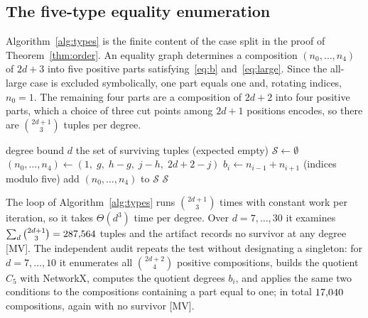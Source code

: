 \documentclass[11pt]{article}
\theoremstyle{remark}
\begin{document}
\begin{table}[ht]
\centering\footnotesize

\caption{SHA-256 fingerprints (first 16 hexadecimal digits) of the scripts and artifacts that carry the exact computations; origin ``audit'' and ``certificate'' are the EXP-003 values recorded by the independent audit and by the certificate, and ``computed here'' marks the EXP-004 values, computed from the archived artifact files when the tables are generated.}
\label{tab:records}
\end{table}

\subsection{The five-type equality enumeration}\label{sec:types}

Algorithm~\ref{alg:types} is the finite content of the case split in the proof of Theorem~\ref{thm:order}. An equality graph determines a composition $(n_0,\ldots,n_4)$ of $2d+3$ into five positive parts satisfying~\eqref{eq:b} and~\eqref{eq:large}. Since the all-large case is excluded symbolically, one part equals one and, rotating indices, $n_0=1$. The remaining four parts are a composition of $2d+2$ into four positive parts, which a choice of three cut points among $2d+1$ positions encodes, so there are $\binom{2d+1}{3}$ tuples per degree.

\begin{algorithm}[ht]
\caption{Five-type equality enumeration with a designated singleton.}\label{alg:types}
\begin{algorithmic}[1]
\Require degree bound $d$
\Ensure the set of surviving tuples (expected empty)
\State $\mathcal S\gets\emptyset$
  \State $(n_0,\ldots,n_4)\gets(1,\;g,\;h-g,\;j-h,\;2d+2-j)$
   $b_i\gets n_{i-1}+n_{i+1}$ (indices modulo five) \EndFor
     \State add $(n_0,\ldots,n_4)$ to $\mathcal S$
  \EndIf
\EndFor
\State \Return $\mathcal S$
\end{algorithmic}
\end{algorithm}

The loop of Algorithm~\ref{alg:types} runs $\binom{2d+1}{3}$ times with constant work per iteration, so it takes $\Theta(d^3)$ time per degree. Over $d=7,\ldots,30$ it examines $\sum_d\binom{2d+1}{3}=287{,}564$ tuples and the artifact records no survivor at any degree [MV]. The independent audit repeats the test without designating a singleton: for $d=7,\ldots,10$ it enumerates all $\binom{2d+2}{4}$ positive compositions, builds the quotient $C_5$ with NetworkX, computes the quotient degrees $b_i$, and applies the same two conditions to the compositions containing a part equal to one; in total $17{,}040$ compositions, again with no survivor [MV].
\end{document}
